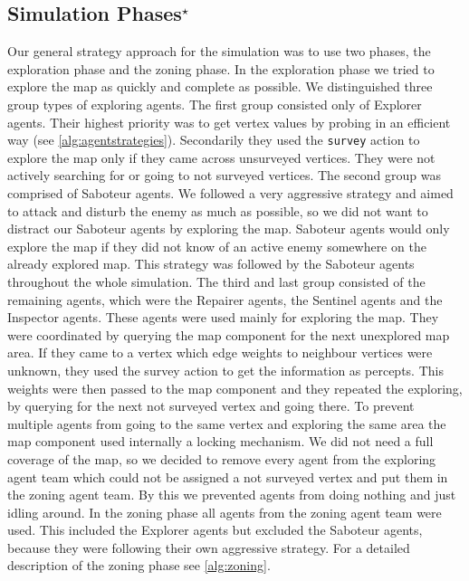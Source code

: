 \subsection[Simulation Phases]{Simulation Phases$^{\star}$}\label{arc:simulation}
Our general strategy approach for the simulation was to use two phases, the exploration phase and the zoning phase.
In the exploration phase we tried to explore the map as quickly and complete as possible.
We distinguished three group types of exploring agents.
The first group consisted only of Explorer agents.
Their highest priority was to get vertex values by probing in an efficient way (see \autoref{alg:agentstrategies}).
Secondarily they used the \texttt{survey} action to explore the map only if they came across unsurveyed vertices.
They were not actively searching for or going to not surveyed vertices.
The second group was comprised of Saboteur agents.
We followed a very aggressive strategy and aimed to attack and disturb the enemy as much as possible, so we did not want to distract our Saboteur agents by exploring the map.
Saboteur agents would only explore the map if they did not know of an active enemy somewhere on the already explored map.
This strategy was followed by the Saboteur agents throughout the whole simulation.
The third and last group consisted of the remaining agents, which were the Repairer agents, the Sentinel agents and the Inspector agents.
These agents were used mainly for exploring the map.
They were coordinated by querying the map component for the next unexplored map area.
If they came to a vertex which edge weights to neighbour vertices were unknown, they used the survey action to get the information as percepts.
This weights were then passed to the map component and they repeated the exploring, by querying for the next not surveyed vertex and going there.
To prevent multiple agents from going to the same vertex and exploring the same area the map component used internally a locking mechanism.
We did not need a full coverage of the map, so we decided to remove every agent from the exploring agent team which could not be assigned a not surveyed vertex and put them in the zoning agent team.
By this we prevented agents from doing nothing and just idling around.
In the zoning phase all agents from the zoning agent team were used.
This included the Explorer agents but excluded the Saboteur agents, because they were following their own aggressive strategy.
For a detailed description of the zoning phase see \autoref{alg:zoning}.

